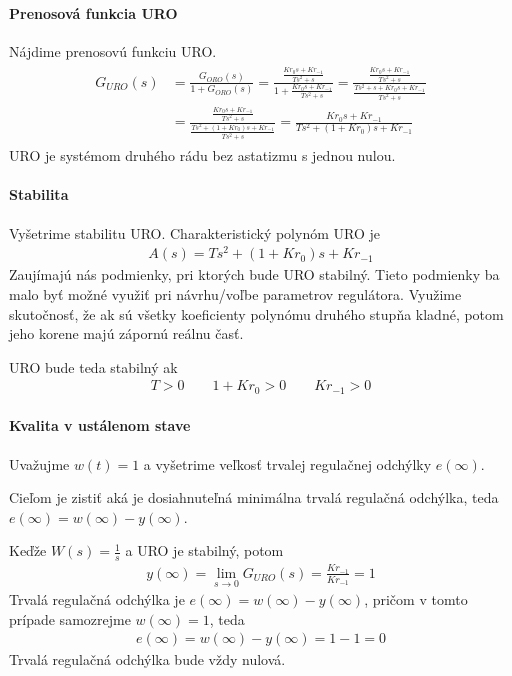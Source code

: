 \documentclass[a4paper, 10pt, ]{article}
\begin{document}
\paragraph{Prenosová funkcia URO}
Nájdime prenosovú funkciu URO.
\begin{align}
    \begin{aligned}
    G_{URO}(s)
    &=  \frac{G_{ORO}(s)}{1+G_{ORO}(s)}
    = \frac{   \frac{K r_0 s + Kr_{-1}}{Ts^2+s}   }{   1+  \frac{K r_0 s + Kr_{-1}}{Ts^2+s} }
    = \frac{   \frac{K r_0 s + Kr_{-1}}{Ts^2+s}   }{   \frac{Ts^2+s + K r_0 s + Kr_{-1}}{Ts^2+s} } \\
    &= \frac{   \frac{K r_0 s + Kr_{-1}}{Ts^2+s}   }{   \frac{Ts^2+  (1 + K r_0) s + Kr_{-1}}{Ts^2+s} }
    = \frac{   K r_0 s + Kr_{-1}   }{   Ts^2+  (1 + K r_0) s + Kr_{-1} }
    \end{aligned}
\end{align}
URO je systémom druhého rádu bez astatizmu s jednou nulou.


\paragraph{Stabilita}
Vyšetrime stabilitu URO. Charakteristický polynóm URO je
\begin{align}
    A(s) = Ts^2+  (1 + K r_0) s + Kr_{-1}
\end{align}
Zaujímajú nás podmienky, pri ktorých bude URO stabilný. Tieto podmienky ba malo byť možné využiť pri návrhu/voľbe parametrov regulátora. Využime skutočnosť, že ak sú všetky koeficienty polynómu druhého stupňa kladné, potom jeho korene majú zápornú reálnu časť.

URO bude teda stabilný ak
\begin{align}
    T>0 \qquad 1+K r_0 >0 \qquad K r_{-1} > 0
\end{align}


\paragraph{Kvalita v ustálenom stave}
Uvažujme $w(t) = 1$ a vyšetrime veľkosť trvalej regulačnej odchýlky $e(\infty)$.

Cieľom je zistiť aká je dosiahnuteľná minimálna trvalá regulačná odchýlka, teda  $e(\infty) = w(\infty) - y(\infty)$.

Keďže $W(s) = \frac{1}{s}$ a URO je stabilný, potom
\begin{align}
    y(\infty) = \lim_{s\to0} G_{URO}(s) = \frac{K r_{-1}}{K r_{-1}} = 1
\end{align}
Trvalá regulačná odchýlka je $e(\infty) = w(\infty) - y(\infty)$, pričom v tomto prípade samozrejme $ w(\infty) = 1$, teda
\begin{align}
    e(\infty)
    = w(\infty) - y(\infty)
    = 1 - 1
    = 0
\end{align}
Trvalá regulačná odchýlka bude vždy nulová.
\end{document}
